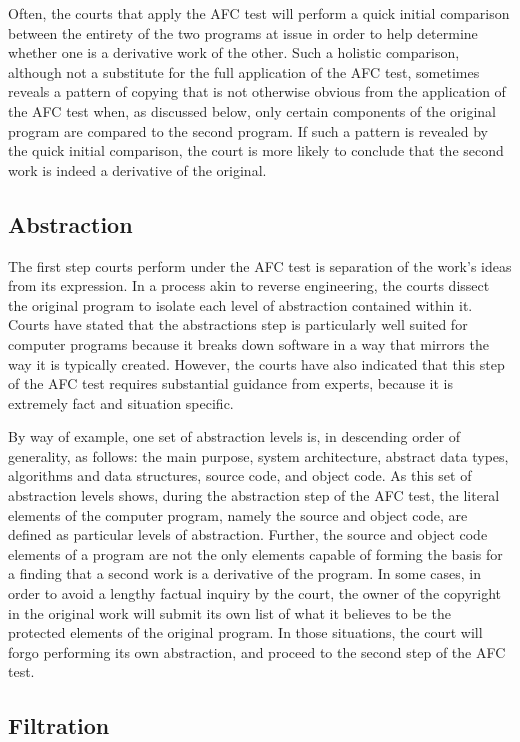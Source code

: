 Often, the courts that apply the AFC test will perform a quick initial
comparison between the entirety of the two programs at issue in order to
help determine whether one is a derivative work of the other. Such a
holistic comparison, although not a substitute for the full application of
the AFC test, sometimes reveals a pattern of copying that is not otherwise
obvious from the application of the AFC test when, as discussed below,
only certain components of the original program are compared to the second
program. If such a pattern is revealed by the quick initial comparison,
the court is more likely to conclude that the second work is indeed a
derivative of the original.

\subsection{Abstraction}

The first step courts perform under the AFC test is separation of the
work's ideas from its expression. In a process akin to reverse
engineering, the courts dissect the original program to isolate each level
of abstraction contained within it. Courts have stated that the
abstractions step is particularly well suited for computer programs
because it breaks down software in a way that mirrors the way it is
typically created. However, the courts have also indicated that this step
of the AFC test requires substantial guidance from experts, because it is
extremely fact and situation specific.

By way of example, one set of abstraction levels is, in descending order
of generality, as follows: the main purpose, system architecture, abstract
data types, algorithms and data structures, source code, and object
code. As this set of abstraction levels shows, during the abstraction step
of the AFC test, the literal elements of the computer program, namely the
source and object code, are defined as particular levels of
abstraction. Further, the source and object code elements of a program are
not the only elements capable of forming the basis for a finding that a
second work is a derivative of the program. In some cases, in order to
avoid a lengthy factual inquiry by the court, the owner of the copyright in
the original work will submit its own list of what it believes to be the
protected elements of the original program. In those situations, the court
will forgo performing its own abstraction, and proceed to the second step of
the AFC test.

\subsection{Filtration}

